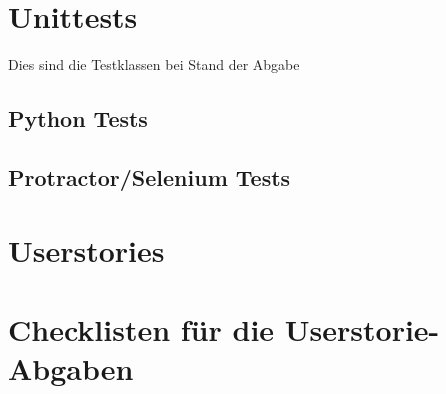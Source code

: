 \documentclass[accentcolor=tud0b,12pt,paper=a4]{tudreport}
\begin{document}
\chapter{Unittests}

Dies sind die Testklassen bei Stand der Abgabe

\section{Python Tests}


\section{Protractor/Selenium Tests}


\chapter{Userstories}


\chapter{Checklisten für die Userstorie-Abgaben}
\end{document}
